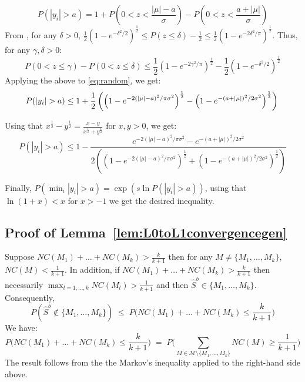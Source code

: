 \documentclass[aos]{imsart}
\theoremstyle{plain}
\begin{document}
\begin{supplement}
\begin{equation}\label{eq:random}
    P(|y_i|>a) = 1+P(0<z<\frac{|\mu|-a}{\sigma})-P(0<z<\frac{a+|\mu|}{\sigma})
\end{equation}
From \cite{chu}, for any $\delta>0$, $\frac{1}{2}\left(1-e^{-\delta^2/2}\right)^{\frac{1}{2}}\leq P(z \leq \delta)-\frac{1}{2}\leq \frac{1}{2}\left(1-e^{-2\delta^2/\pi}\right)^{\frac{1}{2}}$. Thus, for any $\gamma,\delta>0$:
$$ P(0<z \leq \gamma)-P(0<z \leq \delta)\leq
\frac{1}{2}\left(1-e^{-2\gamma^2/\pi}\right)^{\frac{1}{2}}-\frac{1}{2}\left(1-e^{-\delta^2/2}\right)^{\frac{1}{2}}$$
Applying the above to \eqref{eq:random}, we get:
$$P(|y_i|>a) \leq 
1+ \frac{1}{2}\left(\left(1-e^{-2(|\mu|-a)^2/\pi\sigma^2}\right)^{\frac{1}{2}}-\left(1-e^{-(a+|\mu|)^2/2\sigma^2}\right)^{\frac{1}{2}}\right)\\$$

Using that $x^{\frac{1}{2}}-y^{\frac{1}{2}}=\frac{x-y}{x^{\frac{1}{2}}+y^{\frac{1}{2}}}$ for $x,y>0$, we get:
$$P(|y_i|>a) \leq 1- \frac{e^{-2(|\mu|-a)^2/\pi\sigma^2}-e^{-(a+|\mu|)^2/2\sigma^2}}{2\left(\left(1-e^{-2(|\mu|-a)^2/\pi\sigma^2}\right)^{\frac{1}{2}}+\left(1-e^{-(a+|\mu|)^2/2\sigma^2}\right)^{\frac{1}{2}}\right)}$$

Finally, $P(\min_{i}|y_i|>a)=\exp\left(s\ln{P(|y_i|>a)}\right)$, using that $\ln\left(1+ x \right)< x$ for $x>-1$ we get the desired inequality.

\subsection{Proof of Lemma~\ref{lem:L0toL1convergencegen}}
Suppose $NC(M_1)+\ldots+NC(M_k)>\frac{k}{k+1}$ then for any $M\neq \{M_1,\ldots,M_k\}$, $NC(M)<\frac{1}{k+1}$. In addition, if $NC(M_1)+\ldots+NC(M_k)>\frac{k}{k+1}$ then necessarily $\max_{l=1,\ldots,k}NC(M_l)> \frac{1}{k+1}$ and then $\hat{S}^{b}\in \{M_1,\ldots,M_k\}$. Consequently, 
$$
P(\hat{S}^b\not\in \{M_1,\ldots,M_k\})\; \leq\; P\Big(NC(M_1)+\ldots+NC(M_k)\leq\frac{k}{k+1}\Big)$$
We have:
$$P\Big(NC(M_1)+\ldots+NC(M_k)\leq\frac{k}{k+1}\Big)\;=\;P\Big(\sum_{M \in \mathcal{M}\setminus \{M_1,\ldots,M_k\}} NC(M)\geq \frac{1}{k+1}\Big)$$
The result follows from the the Markov's inequality applied to the right-hand side above.


\end{supplement}
\end{document}
